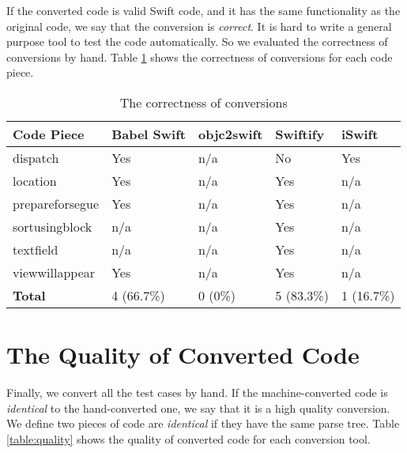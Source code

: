 \documentclass{sfuthesis}
\begin{document}
If the converted code is valid Swift code, and it has the same functionality as the original code, we say that the conversion is \emph{correct}. It is hard to write a general purpose tool to test the code automatically. So we evaluated the correctness of conversions by hand. Table \ref{table:correctness} shows the correctness of conversions for each code piece.

\begin{table}[H]
\begin{center}
\begin{tabular}{|l|l|l|l|l|}
\hline
\textbf{Code Piece} & Babel Swift & objc2swift & Swiftify & iSwift \\
\hline
dispatch        & Yes & n/a & No  & Yes \\
location        & Yes & n/a & Yes & n/a \\
prepareforsegue & Yes & n/a & Yes & n/a \\
sortusingblock  & n/a & n/a & Yes & n/a \\
textfield       & n/a & n/a & Yes & n/a \\
viewwillappear  & Yes & n/a & Yes & n/a \\
\hline
\textbf{Total}  & 4 (66.7\%) & 0 (0\%) & 5 (83.3\%) & 1 (16.7\%) \\
\hline
\end{tabular}
\end{center}
\caption{The correctness of conversions}
\label{table:correctness}
\end{table}

\section{The Quality of Converted Code}

Finally, we convert all the test cases by hand. If the machine-converted code is \emph{identical} to the hand-converted one, we say that it is a high quality conversion. We define two pieces of code are \emph{identical} if they have the same parse tree. Table \ref{table:quality} shows the quality of converted code for each conversion tool.
\end{document}
